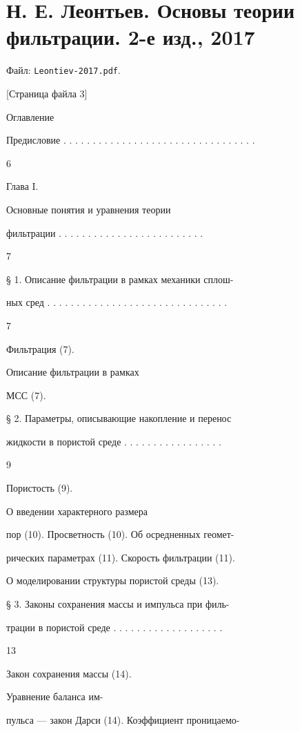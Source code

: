 \documentclass[
  11pt,
]{article}
\begin{document}

\section{Н. Е. Леонтьев. Основы теории фильтрации. 2-е изд., 2017}\label{section-10}

Файл: \texttt{Leontiev-2017.pdf}.

\begingroup\small\setlength{\parindent}{0pt}\setlength{\parskip}{1pt}
{[}Страница файла 3{]}\par
Оглавление\par
Предисловие . . . . . . . . . . . . . . . . . . . . . . . . . . . . . . . . .\par
6\par
Глава I.\par
Основные понятия и уравнения теории\par
фильтрации . . . . . . . . . . . . . . . . . . . . . . . . .\par
7\par
§ 1. Описание фильтрации в рамках механики сплош-\par
ных сред . . . . . . . . . . . . . . . . . . . . . . . . . . . . . . .\par
7\par
Фильтрация (7).\par
Описание фильтрации в рамках\par
МСС (7).\par
§ 2. Параметры, описывающие накопление и перенос\par
жидкости в пористой среде . . . . . . . . . . . . . . . . .\par
9\par
Пористость (9).\par
О введении характерного размера\par
пор (10). Просветность (10). Об осредненных геомет-\par
рических параметрах (11). Скорость фильтрации (11).\par
О моделировании структуры пористой среды (13).\par
§ 3. Законы сохранения массы и импульса при филь-\par
трации в пористой среде . . . . . . . . . . . . . . . . . . .\par
13\par
Закон сохранения массы (14).\par
Уравнение баланса им-\par
пульса --- закон Дарси (14). Коэффициент проницаемо-\par
\end{document}
